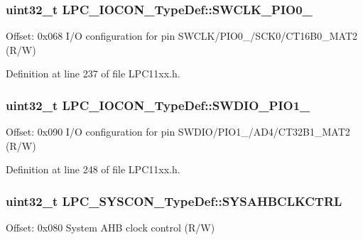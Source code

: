 \subsubsection[{\texorpdfstring{S\+W\+C\+L\+K\+\_\+\+P\+I\+O0\+\_\+10}{SWCLK_PIO0_10}}]{ uint32\+\_\+t L\+P\+C\+\_\+\+I\+O\+C\+O\+N\+\_\+\+Type\+Def\+::\+S\+W\+C\+L\+K\+\_\+\+P\+I\+O0\+\_}\hypertarget{group___l_p_c11xx___definitions_ga1c20cfee78e9855265f6c58d56d43086}{}\label{group___l_p_c11xx___definitions_ga1c20cfee78e9855265f6c58d56d43086}
Offset\+: 0x068 I/O configuration for pin S\+W\+C\+L\+K/\+P\+I\+O0\+\_/\+S\+C\+K0/\+C\+T16\+B0\+\_\+\+M\+A\+T2 (R/W) 

Definition at line 237 of file L\+P\+C11xx.\+h.

\subsubsection[{\texorpdfstring{S\+W\+D\+I\+O\+\_\+\+P\+I\+O1\+\_\+3}{SWDIO_PIO1_3}}]{ uint32\+\_\+t L\+P\+C\+\_\+\+I\+O\+C\+O\+N\+\_\+\+Type\+Def\+::\+S\+W\+D\+I\+O\+\_\+\+P\+I\+O1\+\_}\hypertarget{group___l_p_c11xx___definitions_ga3ced73f257a78ae4b7de9a811ea4d248}{}\label{group___l_p_c11xx___definitions_ga3ced73f257a78ae4b7de9a811ea4d248}
Offset\+: 0x090 I/O configuration for pin S\+W\+D\+I\+O/\+P\+I\+O1\+\_/\+A\+D4/\+C\+T32\+B1\+\_\+\+M\+A\+T2 (R/W) 

Definition at line 248 of file L\+P\+C11xx.\+h.

\subsubsection[{\texorpdfstring{S\+Y\+S\+A\+H\+B\+C\+L\+K\+C\+T\+RL}{SYSAHBCLKCTRL}}]{ uint32\+\_\+t L\+P\+C\+\_\+\+S\+Y\+S\+C\+O\+N\+\_\+\+Type\+Def\+::\+S\+Y\+S\+A\+H\+B\+C\+L\+K\+C\+T\+RL}\hypertarget{group___l_p_c11xx___definitions_ga19b25dc1da3cf2046edafb388eeab57d}{}\label{group___l_p_c11xx___definitions_ga19b25dc1da3cf2046edafb388eeab57d}
Offset\+: 0x080 System A\+HB clock control (R/W) 


